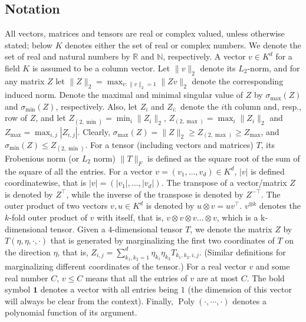 \documentclass[twoside,11pt]{article}
\newcommand{\real}{\mathbb{R}}
\renewcommand{\natural}{\mathbb{N}}
\DeclareMathOperator{\pol}{Poly}
\newcommand{\poly}[1]{\pol\left(#1\right)}
\begin{document}
\subsection{Notation}
All vectors, matrices and tensors are real or complex valued, unless otherwise stated; below $K$ denotes either the set of real or complex numbers. We denote the set of real and natural numbers by $\real$ and $\natural$, respectively.
A vector $v \in K^d$ for a field $K$ is assumed to be a column vector.
Let $\|v\|_2$ denote its $L_2$-norm, and for any matrix $Z$ let $\|Z\|_2=\max_{v:\|v\|_2=1}{\|Z v\|_2}$ denote the corresponding induced norm. Denote the maximal and minimal singular value of $Z$ by $\sigma_{\max}(Z)$ and  $\sigma_{\min}(Z)$, respectively. Also, let $Z_i$ and $Z_{i:}$ denote the $i$th column and, resp., row of $Z$, and let $Z_{(2,\min)} = \min_{i} \|Z_i\|_2$, $Z_{(2,\max)} = \max_{i} \|Z_i\|_2$ and $Z_{\max} = \max_{i,j} |Z_{i,j}|$. 
Clearly, $\sigma_{\max}(Z) =\|Z\|_2 \ge Z_{(2,\max)} \ge Z_{\max}$, and $\sigma_{\min}(Z) \le Z_{(2,\min)}$. For a tensor (including vectors and matrices) $T$, its Frobenious norm (or $L_2$ norm) $\|T\|_F$  is defined as the square root of the sum of the square of all the entries.  
For a vector $v=(v_1,\ldots,v_d) \in K^d$, $\vert v \vert$ is defined coordinatewise, that is $\vert v \vert=(\vert v_1 \vert,\ldots,\vert v_d\vert)$. 
The transpose of a vector/matrix $Z$ is denoted by $Z^\top$, while the inverse of the transpose is denoted by $Z^{-\top}$.  
The outer product of two vectors $v, u \in K^d$ is denoted by $u\otimes v=u v^\top$. 
$v^{\otimes k}$ denotes the $k$-fold outer product of $v$ with itself, that is, $v\otimes v\otimes v \ldots \otimes v$, which is a k-dimensional tensor.
Given a $4$-dimensional tensor $T$, we denote the matrix $Z$ by $T(\eta,\eta,\cdot , \cdot)$ that is generated by marginalizing the first two coordinates of $T$ on the direction $\eta$, that is,
$Z_{i,j} = \sum_{k_1,k_2 = 1}^{d} \eta_{k_1} \eta_{k_2} T_{k_1,k_2,i,j}$. (Similar definitions for marginalizing different coordinates of the tensor.)
For a real vector $v$ and some real number $C$, $v \le C$ means that all the entries of $v$ are at most $C$. 
The bold symbol $\boldsymbol{1}$ denotes a vector with all entries being $1$ (the dimension of this vector will always be clear from the context).
Finally, $\poly{\cdot,\cdots,\cdot}$ denotes a polynomial function of its argument.
\end{document}
